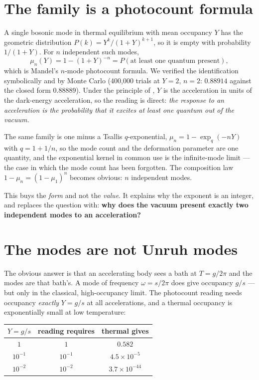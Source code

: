 \documentclass[11pt,letterpaper]{article}
\begin{document}
\section{The family is a photocount formula}
A single bosonic mode in thermal equilibrium with mean occupancy $Y$ has the geometric distribution $P(k)=Y^k/(1+Y)^{k+1}$, so it is empty with probability $1/(1+Y)$. For $n$ independent such modes,
\begin{equation}
\mu_n(Y)=1-(1+Y)^{-n}=P(\text{at least one quantum present}),
\end{equation}
which is Mandel's $n$-mode photocount formula. We verified the identification symbolically and by Monte Carlo (400{,}000 trials at $Y=2$, $n=2$: $0.88914$ against the closed form $0.88889$). Under the principle of \cite{paper27}, $Y$ is the acceleration in units of the dark-energy acceleration, so the reading is direct: \emph{the response to an acceleration is the probability that it excites at least one quantum out of the vacuum.}

The same family is one minus a Tsallis $q$-exponential, $\mu_n=1-\exp_q(-nY)$ with $q=1+1/n$, so the mode count and the deformation parameter are one quantity, and the exponential kernel in common use is the infinite-mode limit --- the case in which the mode count has been forgotten. The composition law $1-\mu_n=(1-\mu_1)^n$ becomes obvious: $n$ independent modes.

This buys the \emph{form} and not the \emph{value}. It explains why the exponent is an integer, and replaces the question with: \textbf{why does the vacuum present exactly two independent modes to an acceleration?}

\section{The modes are not Unruh modes}
The obvious answer is that an accelerating body sees a bath at $T=g/2\pi$ and the modes are that bath's. A mode of frequency $\omega=s/2\pi$ does give occupancy $g/s$ --- but only in the classical, high-occupancy limit. The photocount reading needs occupancy \emph{exactly} $Y=g/s$ at all accelerations, and a thermal occupancy is exponentially small at low temperature:

\begin{center}
\begin{tabular}{ccc}
\toprule
$Y=g/s$ & reading requires & thermal gives \\
\midrule
$1$ & $1$ & $0.582$ \\
$10^{-1}$ & $10^{-1}$ & $4.5\times10^{-5}$ \\
$10^{-2}$ & $10^{-2}$ & $3.7\times10^{-44}$ \\
\bottomrule
\end{tabular}
\end{center}
\end{document}
